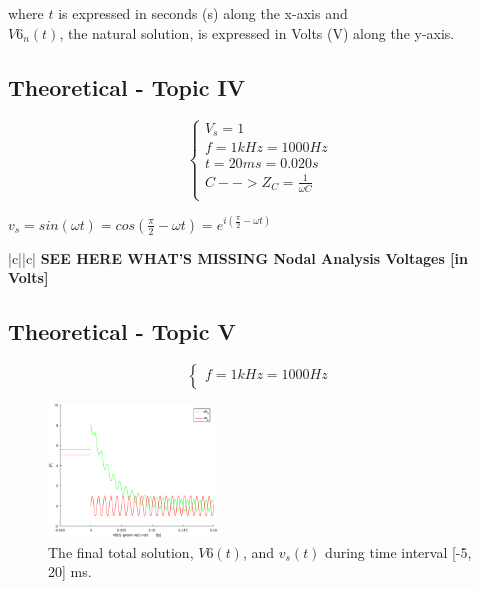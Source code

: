 where $t$ is expressed in seconds (s) along the x-axis and \\
$V6_n(t)$, the natural solution, is expressed in Volts (V) along the y-axis.
 
\subsection{Theoretical - Topic IV}
\label{subsec:fourth_topic}

\[
\left\{\begin{matrix}
V_s = 1 \\
f = 1 kHz = 1000 Hz \\
t = 20 ms = 0.020 s \\
C --> Z_C=\frac{1}{\omega C} \\
\end{matrix}\right.
\]

$ v_s=sin(\omega t)=cos(\frac{\pi}{2}-\omega t)=e^{i(\frac{\pi}{2}-\omega t)} $ \\

\begin{center}
   \begin{tabular}{|c||c|}
      \hline    
       {\bf SEE HERE WHAT'S MISSING Nodal Analysis Voltages [in Volts]} \\
      \hline
        
   \end{tabular}
 \end{center}
  
 
\subsection{Theoretical - Topic V}
\label{subsec:fifth_topic}

\[
\left\{\begin{matrix}
f = 1 kHz = 1000 Hz \\
\end{matrix}\right.
\]

\begin{figure}[H] \centering
\includegraphics[width=0.4\textwidth]{total.eps}
\caption{The final total solution, $V6(t)$,  and $v_s(t)$ during time interval [-5, 20] ms.}
\label{fig:theo_fifth}
\end{figure}


